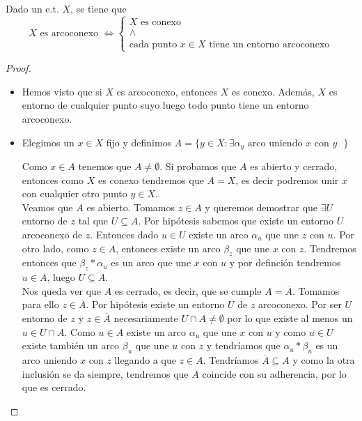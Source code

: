 \begin{teo}\label{teo:arcoconexo_entorno}
    Dado un e.t. $X$, se tiene que 
    \begin{equation*}
        X \text{ es arcoconexo } \iff \left\{\begin{array}{ll}
            X \text{ es conexo } \\
            \wedge \\
            \text{cada punto } x\in X \text{ tiene un entorno arcoconexo}
        \end{array}\right.
    \end{equation*}
    
    \begin{proof}\
        \begin{itemize}
            \item[$\Rightarrow$)] Hemos visto que si $X$ es arcoconexo, entonces $X$ es conexo. Además, $X$ es entorno de cualquier punto suyo luego todo punto tiene un entorno arcoconexo.
            \item[$\Leftarrow$)] Elegimos un $x\in X$ fijo y definimos $A = \{y\in X : \exists \alpha_y \text{ arco uniendo $x$ con $y$ }\}$
            
            Como $x\in A$ tenemos que $A\neq \emptyset$. Si probamos que $A$ es abierto y cerrado, entonces como $X$ es conexo tendremos que $A=X$, es decir podremos unir $x$ con cualquier otro punto $y\in X$.\\

            Veamos que $A$ es abierto. Tomamos $z\in A$ y queremos demostrar que $\exists U$ entorno de $z$ tal que $U\subseteq A$. Por hipótesis sabemos que existe un entorno $U$ arcoconexo de $z$. Entonces dado $u\in U$ existe un arco $\alpha_u$ que une $z$ con $u$. Por otro lado, como $z\in A$, entonces existe un arco $\beta_z$ que une $x$ con $z$. Tendremos entonces que $\beta_z\ast\alpha_u$ es un arco que une $x$ con $u$ y por definción tendremos $u\in A$, luego $U\subseteq A$.\\
            
            Nos queda ver que $A$ es cerrado, es decir, que se cumple $A=\overline{A}$. Tomamos para ello $z\in \overline{A}$. Por hipótesis existe un entorno $U$ de $z$ arcoconexo. Por ser $U$ entorno de $z$ y $z\in \overline{A}$ necesariamente $U\cap A \neq \emptyset$ por lo que existe al menos un $u\in U \cap A$. Como $u\in A$ existe un arco $\alpha_u$ que une $x$ con $u$ y como $u\in U$ existe también un arco $\beta_u$ que une $u$ con $z$ y tendríamos que $\alpha_u\ast\beta_u$ es un arco uniendo $x$ con $z$ llegando a que $z\in A$. Tendríamos $\overline{A}\subseteq A$ y como la otra inclusión se da siempre, tendremos que $A$ coincide con su adherencia, por lo que es cerrado.
        \end{itemize}
    \end{proof}
\end{teo}

